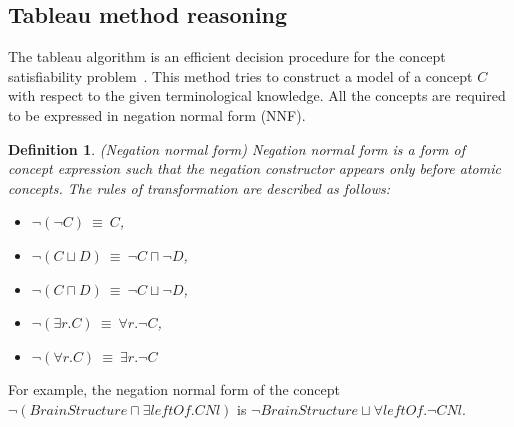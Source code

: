 \documentclass{article}
\newtheorem{mydef}{Definition}
\begin{document}
\subsection{Tableau method reasoning}\label{sec:reasoning}
The tableau algorithm is an efficient decision procedure for the concept satisfiability problem~\cite{baader2001overview,gore2007exptime,nguyen2009efficient}.
This method tries to construct a model of a concept $C$ with respect to the given terminological knowledge. 
All the concepts are required to be expressed in negation normal form (NNF). 
\begin{mydef}(Negation normal form)
Negation normal form is a form of concept expression such that the negation constructor appears only before atomic concepts.
The rules of transformation are described as follows:
\begin{itemize}
\item  $\neg(\neg C) ~\equiv~ C$,
\item $\neg(C\sqcup D) ~\equiv~ \neg C \sqcap \neg D$,
\item $\neg(C\sqcap D) ~\equiv~ \neg C \sqcup \neg D$,
\item $\neg(\exists r.C) ~\equiv~ \forall r.\neg C$,
\item $\neg(\forall r.C) ~\equiv~  \exists r.\neg C$
\end{itemize}
\end{mydef}
For example, the negation normal form of the concept $\neg (BrainStructure\sqcap \exists leftOf.CNl)$ is $\neg BrainStructure \sqcup \forall leftOf.\neg CNl$.
\end{document}
